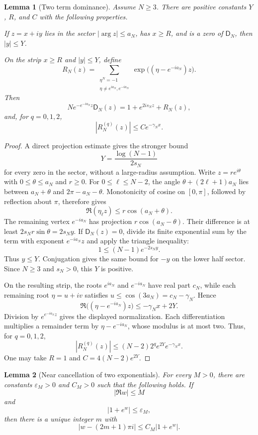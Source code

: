 \documentclass[11pt,letterpaper]{article}
\newtheorem{lemma}[lemma]{Lemma}
\theoremstyle{definition}
\theoremstyle{remark}
\newcommand{\Dfun}{\mathsf D}
\begin{document}
\begin{lemma}[Two term dominance]\label{lem:two_term_dominance}
Assume $N\geq3$.  There are positive constants $Y$, $R$, and $C$ with the following properties.

If $z=x+iy$ lies in the sector $|\arg z|\leq a_N$, has $x\geq R$, and is a zero of $\Dfun_N$, then $|y|\leq Y$.

On the strip $x\geq R$ and $|y|\leq Y$, define
\[
R_N(z)
=
\sum_{\substack{\eta^N=-1\\
\eta\ne e^{ia_N},e^{-ia_N}}}
\exp\bigl((\eta-e^{-ia_N})z\bigr).
\]
Then
\[
N e^{-e^{-ia_N}z}\Dfun_N(z)
=
1+e^{2is_Nz}+R_N(z),
\]
and, for $q=0,1,2$,
\[
|R_N^{(q)}(z)|
\leq
C e^{-\gamma_Nx}.
\]
\end{lemma}

\begin{proof}
A direct projection estimate gives the stronger bound
\[
Y=\frac{\log(N-1)}{2s_N}
\]
for every zero in the sector, without a large-radius assumption.
Write $z=re^{i\theta}$ with $0\leq\theta\leq a_N$ and $r\geq0$.
For $0\leq\ell\leq N-2$, the angle
$\theta+(2\ell+1)a_N$ lies between $a_N+\theta$ and
$2\pi-a_N-\theta$. Monotonicity of cosine on $[0,\pi]$, followed by
reflection about $\pi$, therefore gives
\[
\Re(\eta_\ell z)\leq r\cos(a_N+\theta).
\]
The remaining vertex $e^{-ia_N}$ has projection $r\cos(a_N-\theta)$.
Their difference is at least $2s_Nr\sin\theta=2s_Ny$.
If $\Dfun_N(z)=0$, divide its finite exponential sum by the term
with exponent $e^{-ia_N}z$ and apply the triangle inequality:
\[
1\leq(N-1)e^{-2s_Ny}.
\]
Thus $y\leq Y$. Conjugation gives the same bound for $-y$ on the lower
half sector. Since $N\geq3$ and $s_N>0$, this $Y$ is positive.

On the resulting strip, the roots $e^{ia_N}$ and $e^{-ia_N}$ have
real part $c_N$, while each remaining root $\eta=u+iv$ satisfies
$u\leq\cos(3a_N)=c_N-\gamma_N$. Hence
\[
\Re\bigl((\eta-e^{-ia_N})z\bigr)
\leq-\gamma_Nx+2Y.
\]
Division by $e^{e^{-ia_N}z}$ gives the displayed normalization.
Each differentiation multiplies a remainder term by
$\eta-e^{-ia_N}$, whose modulus is at most two. Thus, for $q=0,1,2$,
\[
|R_N^{(q)}(z)|\leq(N-2)2^qe^{2Y}e^{-\gamma_Nx}.
\]
One may take $R=1$ and $C=4(N-2)e^{2Y}$.
\end{proof}

\begin{lemma}[Near cancellation of two exponentials]\label{lem:near_cancellation}
For every $M>0$, there are constants $\varepsilon_M>0$ and $C_M>0$ such that the following holds.  If
\[
|\Re w|\leq M
\]
and
\[
|1+e^w|\leq\varepsilon_M,
\]
then there is a unique integer $m$ with
\[
|w-(2m+1)\pi i|
\leq
C_M|1+e^w|.
\]
\end{lemma}
\end{document}
